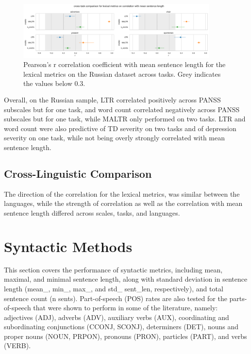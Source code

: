 \begin{figure}[ht!]
    \includegraphics[width=0.9\textwidth, center]{Figures/chapter_4/lexical/ru_corr_len.png} 
\captionsetup{width=\textwidth}
\caption[Lexical Metrics: Russian, Length Correlation]{\label{fig:results:lexical:ru:corr_len} Pearson's r correlation coefficient with mean sentence length for the lexical metrics on the Russian dataset across tasks. Grey indicates the values below 0.3.}
\end{figure}

Overall, on the Russian sample, LTR correlated positively across PANSS subscales but for one task, and word count correlated negatively across PANSS subscales but for one task, while MALTR only performed on two tasks. LTR and word count were also predictive of TD severity on two tasks and of depression severity on one task, while not being overly strongly correlated with mean sentence length.

\subsection{Cross-Linguistic Comparison}
The direction of the correlation for the lexical metrics, was similar between the languages, while the strength of correlation as well as the correlation with mean sentence length differed across scales, tasks, and languages. 


\clearpage
\section{Syntactic Methods}
\label{sec:results:clinical:syntactic}
This section covers the performance of syntactic metrics, including mean, maximal, and minimal sentence length, along with standard deviation in sentence length (mean\_, min\_, max\_, and std\_  sent\_len, respectively), and total sentence count (n sents). Part-of-speech (POS) rates are also tested for the parts-of-speech that were shown to perform in some of the literature, namely: adjectives (ADJ), adverbs (ADV), auxiliary verbs (AUX), coordinating and subordinating conjunctions (CCONJ, SCONJ), determiners (DET), nouns and proper nouns (NOUN, PRPON), pronouns (PRON), particles (PART), and verbs (VERB).

